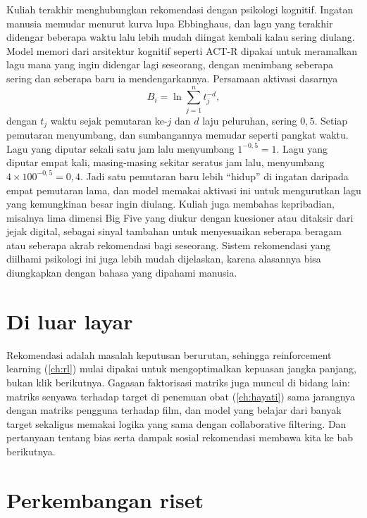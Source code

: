 Kuliah terakhir menghubungkan rekomendasi dengan psikologi kognitif. Ingatan manusia memudar menurut
kurva lupa Ebbinghaus, dan lagu yang terakhir didengar beberapa waktu lalu lebih mudah diingat
kembali kalau sering diulang. Model memori dari arsitektur kognitif seperti ACT-R \citep{anderson2004} dipakai untuk
meramalkan lagu mana yang ingin didengar lagi seseorang, dengan menimbang seberapa sering dan seberapa
baru ia mendengarkannya. Persamaan aktivasi dasarnya
\begin{equation}
B_i=\ln\sum_{j=1}^{n}t_j^{-d},
\end{equation}
dengan $t_j$ waktu sejak pemutaran ke-$j$ dan $d$ laju peluruhan, sering $0{,}5$. Setiap pemutaran menyumbang, dan
sumbangannya memudar seperti pangkat waktu. Lagu yang diputar sekali satu jam lalu menyumbang $1^{-0{,}5}=1$. Lagu yang
diputar empat kali, masing-masing sekitar seratus jam lalu, menyumbang $4\times100^{-0{,}5}=0{,}4$. Jadi satu
pemutaran baru lebih ``hidup'' di ingatan daripada empat pemutaran lama, dan model memakai aktivasi ini untuk
mengurutkan lagu yang kemungkinan besar ingin diulang. Kuliah juga membahas kepribadian, misalnya lima dimensi Big
Five yang diukur dengan kuesioner atau ditaksir dari jejak digital, sebagai sinyal tambahan untuk menyesuaikan
seberapa beragam atau seberapa akrab rekomendasi bagi seseorang. Sistem rekomendasi yang diilhami psikologi ini juga lebih mudah dijelaskan,
karena alasannya bisa diungkapkan dengan bahasa yang dipahami manusia.

\section{Di luar layar}

Rekomendasi adalah masalah keputusan berurutan, sehingga reinforcement learning (\cref{ch:rl}) mulai
dipakai untuk mengoptimalkan kepuasan jangka panjang, bukan klik berikutnya. Gagasan faktorisasi matriks
juga muncul di bidang lain: matriks senyawa terhadap target di penemuan obat (\cref{ch:hayati}) sama
jarangnya dengan matriks pengguna terhadap film, dan model yang belajar dari banyak target sekaligus
memakai logika yang sama dengan collaborative filtering. Dan pertanyaan tentang bias serta dampak
sosial rekomendasi membawa kita ke bab berikutnya.

\section{Perkembangan riset}

